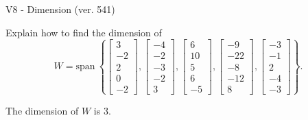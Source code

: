 \begin{exercise}
  \begin{exerciseTitle}V8 - Dimension (ver. 541)\end{exerciseTitle}
  \begin{exerciseStatement}
    Explain how to find the dimension of 
\[W=\mathrm{span}\ \left\{\left[\begin{array}{r}
3 \\
-2 \\
2 \\
0 \\
-2
\end{array}\right] , \left[\begin{array}{r}
-4 \\
-2 \\
-3 \\
-2 \\
3
\end{array}\right] , \left[\begin{array}{r}
6 \\
10 \\
5 \\
6 \\
-5
\end{array}\right] , \left[\begin{array}{r}
-9 \\
-22 \\
-8 \\
-12 \\
8
\end{array}\right] , \left[\begin{array}{r}
-3 \\
-1 \\
2 \\
-4 \\
-3
\end{array}\right]\right\}.\]



  \end{exerciseStatement}
  \begin{exerciseAnswer}
   The dimension of \(W\) is  \(3\).
  


  \end{exerciseAnswer}
\end{exercise}
